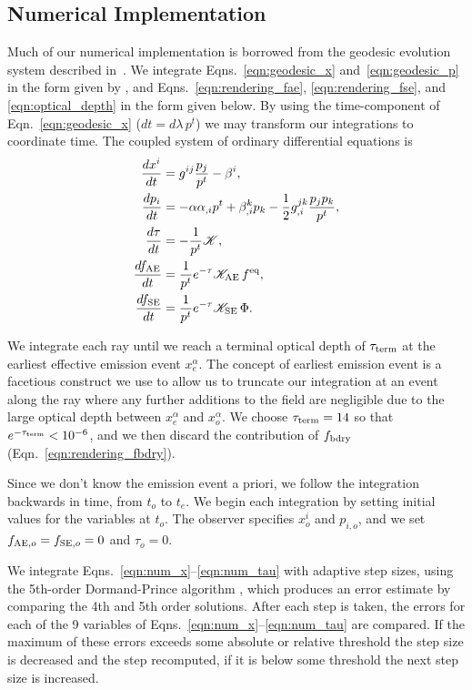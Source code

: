 \documentclass[aps,floatfix,prd,superscriptaddress,twocolumn]{revtex4-1}
\newcommand{\todo}[1]{\marginpar{\tiny{\textcolor{red}{#1}}}}
\begin{document}
\subsection{Numerical Implementation}
\label{ssec:numerical}
Much of our numerical implementation is borrowed from the geodesic evolution
system described in~\cite{bohn2016-code}.
We integrate Eqns.~\ref{eqn:geodesic_x} and~\ref{eqn:geodesic_p} in the form
given by \citep{hugh1994-eh_finding},
and Eqns.~\ref{eqn:rendering_fae}, \ref{eqn:rendering_fse},
and \ref{eqn:optical_depth} in the form given below.
By using the time-component of Eqn.~\ref{eqn:geodesic_x} ($dt=d\lambda \, p^t$)
we may transform our integrations to coordinate time.
The coupled system of ordinary differential equations is
\begin{align}
  \label{eqn:num_x}
  \frac{dx^i}{dt} &=
  g^{ij} \frac{p_j}{p^t} - \beta^{i},\\
  \label{eqn:num_p}
  \frac{dp_i}{dt} &=
  -\alpha \alpha_{,i} p^t
  + \beta^k_{,i} p_k
  - \frac{1}{2} g^{jk}_{,i}\frac{p_j p_k}{p^t},\\
  \label{eqn:num_tau}
  \frac{d\tau}{dt} &=
  - \frac{1}{p^t}\mathscr{K},\\
  \label{eqn:num_fae}
  \frac{df_{\rm AE}}{dt} &=
  \frac{1}{p^t}e^{-\tau}\mathscr{K_{\rm AE}} \,f^{\rm eq},\\
  \label{eqn:num_fse}
  \frac{df_{\rm SE}}{dt} &=
  \frac{1}{p^t}e^{-\tau}\mathscr{K_{\rm SE}} \,\Phi.
\end{align}

We integrate each ray until we reach a terminal optical depth of
$\tau_{\rm term}$ at the earliest effective emission event $x_e^\alpha$.
The concept of earliest emission event is a facetious construct we use
to allow us to truncate our integration at an event along the ray where any
further additions to the field are negligible due to the large optical depth
between $x_e^\alpha$ and $x_o^\alpha$.
We choose $\tau_{\rm term}=14$ so that $e^{-\tau_{\rm term}}<10^{-6}$,
and we then discard the contribution of $f_{\rm bdry}$
(Eqn.~\ref{eqn:rendering_fbdry}).

Since we don't know the emission event a priori,
we follow the integration backwards in time,
from $t_o$ to $t_e$.
We begin each integration by setting initial values for the variables at $t_o$.
The observer specifies $x^i_o$ and $p_{i,o}$,
and we set $f_{{\rm AE},o}=f_{{\rm SE},o}=0$ and $\tau_o=0$.

We integrate Eqns.~\ref{eqn:num_x}--\ref{eqn:num_tau} with adaptive step sizes,
using the 5th-order Dormand-Prince algorithm \cite{pres2007-nr_3rd_ed},
which produces an error estimate by comparing the 4th and 5th order solutions.
\todo{update to 3rd order Runge-Kutta}
After each step is taken, the errors for each of the 9 variables of
Eqns.~\ref{eqn:num_x}--\ref{eqn:num_tau} are compared.
If the maximum of these errors exceeds some absolute or relative threshold
\todo{specify ScaledAbsRel algorithm}
the step size is decreased and the step recomputed,
if it is below some threshold the next step size is increased.
\todo{specify}
\end{document}
